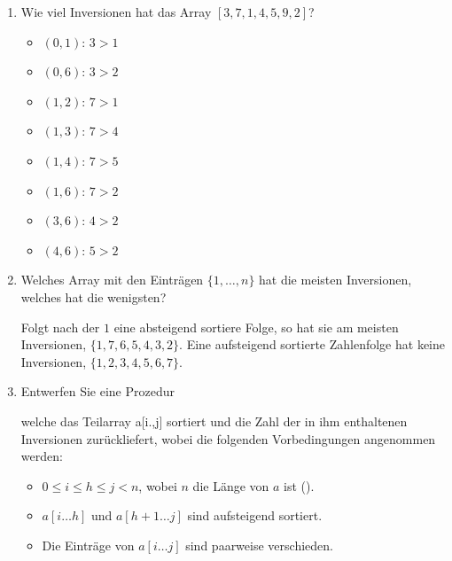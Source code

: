 \documentclass{bschlangaul-aufgabe}
\begin{document}
\begin{enumerate}


\item Wie viel Inversionen hat das Array $[3, 7, 1, 4, 5, 9, 2]$?

\begin{bAntwort}
\begin{itemize}
\item $(0, 1)$: $3 > 1$
\item $(0, 6)$: $3 > 2$
\item $(1, 2)$: $7 > 1$
\item $(1, 3)$: $7 > 4$
\item $(1, 4)$: $7 > 5$
\item $(1, 6)$: $7 > 2$
\item $(3, 6)$: $4 > 2$
\item $(4, 6)$: $5 > 2$
\end{itemize}
\end{bAntwort}


\item Welches Array mit den Einträgen $\{ 1, \dots, n\}$ hat die meisten
Inversionen, welches hat die wenigsten?

\begin{bAntwort}
Folgt nach der $1$ eine absteigend sortiere Folge, so hat sie am meisten
Inversionen, \zB $\{ 1, 7, 6, 5, 4, 3, 2 \}$.
%
Eine aufsteigend sortierte Zahlenfolge hat keine Inversionen, \zB
$\{ 1, 2, 3, 4, 5, 6, 7 \}$.
\end{bAntwort}


\item Entwerfen Sie eine Prozedur

welche das Teilarray a[i.,j] sortiert und die Zahl der in ihm
enthaltenen Inversionen zurückliefert, wobei die folgenden
Vorbedingungen angenommen werden:

\begin{itemize}
\item $0 \leq i \leq h \leq j < n$, wobei $n$ die Länge von $a$ ist
().

\item $a[i \dots h]$ und $a[h + 1 \dots j]$ sind aufsteigend sortiert.

\item Die Einträge von $a[i \dots j]$ sind paarweise verschieden.
\end{itemize}


\end{enumerate}
\end{document}
